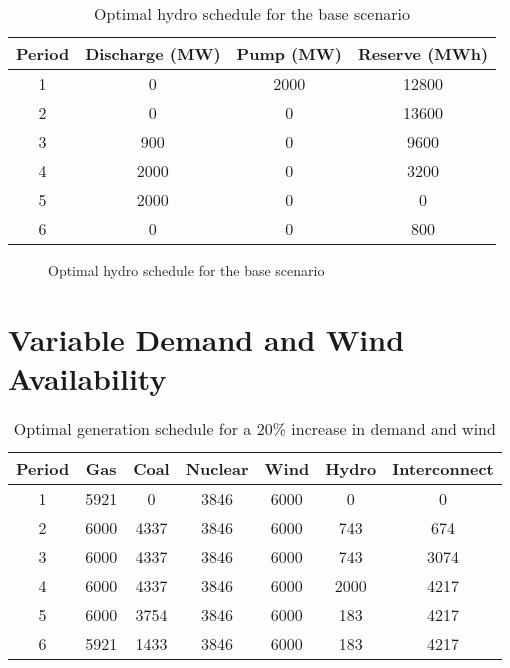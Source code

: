 \documentclass[twocolumn]{article}
\begin{document}
    
    
    \begin{table}[H]
    	\centering
    	\begin{tabular}{cccc}
        	\hline
        	Period & Discharge (MW) & Pump (MW) & Reserve (MWh) \\ \hline
            1 & 0 & 2000 & 12800 \\
            2 & 0 & 0 & 13600 \\
            3 & 900 & 0 & 9600 \\
            4 & 2000 & 0 & 3200 \\
            5 & 2000 & 0 & 0 \\
            6 & 0 & 0 & 800 \\ \hline
        \end{tabular}
    	\caption{Optimal hydro schedule for the base scenario\label{table:base-hydrosched}}
    \end{table}
    
    \begin{figure}[H]
    \centering
    	\caption{Optimal hydro schedule for the base scenario\label{fig:base-hydrosched}}
    \end{figure}
    

    
    
    \section{Variable Demand and Wind Availability}\label{sec:app-variable}
	
    \begin{table}[h!]
    	\centering
        \begin{tabular}{ccccccc}
        	\hline
        	Period & Gas & Coal & Nuclear & Wind & Hydro & Interconnect \\ \hline
        	1 & 5921 & 0 & 3846 & 6000 & 0 & 0 \\
            2 & 6000 & 4337 & 3846 & 6000 & 743 & 674 \\
            3 & 6000 & 4337 & 3846 & 6000 & 743 & 3074 \\
            4 & 6000 & 4337 & 3846 & 6000 & 2000 & 4217 \\
            5 & 6000 & 3754 & 3846 & 6000 & 183 & 4217 \\
            6 & 5921 & 1433 & 3846 & 6000 & 183 & 4217 \\ \hline
        \end{tabular}
        \caption{Optimal generation schedule for a 20\% increase in demand and wind\label{table:variable-optgensched}}
    \end{table}
    
\end{document}
